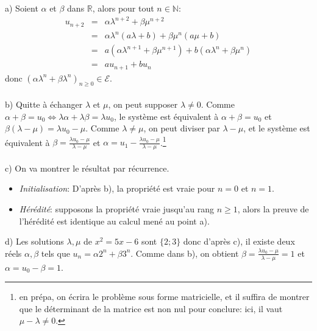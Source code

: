 a) Soient $\alpha$ et $\beta$ dans $\mathbb{R}$, alors pour tout $n\in\mathbb{N}$:
\begin{eqnarray*}
  u_{n+2} &=& \alpha\lambda^{n+2}+\beta\mu^{n+2} \\
  &=& \alpha\lambda^{n}(a\lambda + b)+\beta\mu^{n}(a\mu + b) \\
   &=& a\left(\alpha\lambda^{n+1}+\beta\mu^{n+1}\right)+b\left(\alpha\lambda^{n}+\beta\mu^{n}\right) \\
   &=& au_{n+1}+bu_n
\end{eqnarray*}
donc $(\alpha\lambda^{n}+\beta\lambda^{n})_{n\geq 0} \in \mathcal{E}$.\\ \\
b) Quitte à échanger $\lambda$ et $\mu$, on peut supposer $\lambda\neq 0$. Comme $\alpha+\beta=u_0 \Leftrightarrow \lambda\alpha + \lambda \beta = \lambda u_0$, le système est équivalent à $\alpha+\beta=u_0$ et $\beta(\lambda-\mu)=\lambda u_0 - \mu$. Comme $\lambda \neq \mu$, on peut diviser par $\lambda-\mu$, et le système est équivalent à $\beta = \frac{\lambda u_0 - \mu}{\lambda-\mu}$ et $\alpha=u_1-\frac{\lambda u_0 - \mu}{\lambda-\mu}$.\footnote{en prépa, on écrira le problème sous forme matricielle, et il suffira de montrer que le déterminant de la matrice est non nul pour conclure: ici, il vaut $\mu-\lambda\neq 0$.}\\ \\
c) On va montrer le résultat par récurrence.
\begin{itemize}
  \item \textit{Initialisation}: D’après b), la propriété est vraie pour $n=0$ et $n=1$.
  \item \textit{Hérédité}: supposons la propriété vraie jusqu'au rang $n\geq 1$, alors la preuve de l'hérédité est identique au calcul mené au point a).\\
\end{itemize}
d) Les solutions $\lambda, \mu$ de $x^2=5x-6$ sont $\{2;3\}$ donc d’après c), il existe deux réels $\alpha, \beta$ tels que $u_n=\alpha 2^n + \beta 3^n$. Comme dans b), on obtient $\beta = \frac{\lambda u_0 - \mu}{\lambda-\mu} = 1$ et $\alpha = u_0-\beta = 1$.
